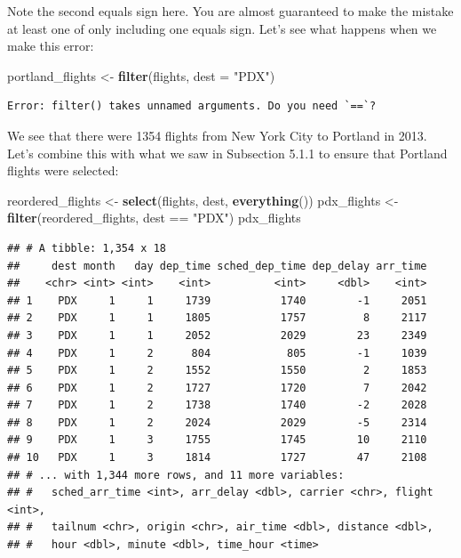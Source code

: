 \documentclass[]{tufte-book}
\newenvironment{Shaded}{\begin{snugshade}}{\end{snugshade}}
\newcommand{\KeywordTok}[1]{\textcolor[rgb]{0.13,0.29,0.53}{\textbf{{#1}}}}
\newcommand{\DataTypeTok}[1]{\textcolor[rgb]{0.13,0.29,0.53}{{#1}}}
\newcommand{\StringTok}[1]{\textcolor[rgb]{0.31,0.60,0.02}{{#1}}}
\newcommand{\NormalTok}[1]{{#1}}
\begin{document}
Note the second equals sign here. You are almost guaranteed to make the
mistake at least one of only including one equals sign. Let's see what
happens when we make this error:

\begin{Shaded}
\begin{Highlighting}[]
\NormalTok{portland_flights <-}\StringTok{ }\KeywordTok{filter}\NormalTok{(flights, }\DataTypeTok{dest =} \StringTok{"PDX"}\NormalTok{)}
\end{Highlighting}
\end{Shaded}

\begin{verbatim}
Error: filter() takes unnamed arguments. Do you need `==`?
\end{verbatim}

We see that there were 1354 flights from New York City to Portland in
2013. Let's combine this with what we saw in Subsection 5.1.1 to ensure
that Portland flights were selected:

\begin{Shaded}
\begin{Highlighting}[]
\NormalTok{reordered_flights <-}\StringTok{ }\KeywordTok{select}\NormalTok{(flights, dest, }\KeywordTok{everything}\NormalTok{())}
\NormalTok{pdx_flights <-}\StringTok{ }\KeywordTok{filter}\NormalTok{(reordered_flights, dest ==}\StringTok{ "PDX"}\NormalTok{)}
\NormalTok{pdx_flights}
\end{Highlighting}
\end{Shaded}

\begin{verbatim}
## # A tibble: 1,354 x 18
##     dest month   day dep_time sched_dep_time dep_delay arr_time
##    <chr> <int> <int>    <int>          <int>     <dbl>    <int>
## 1    PDX     1     1     1739           1740        -1     2051
## 2    PDX     1     1     1805           1757         8     2117
## 3    PDX     1     1     2052           2029        23     2349
## 4    PDX     1     2      804            805        -1     1039
## 5    PDX     1     2     1552           1550         2     1853
## 6    PDX     1     2     1727           1720         7     2042
## 7    PDX     1     2     1738           1740        -2     2028
## 8    PDX     1     2     2024           2029        -5     2314
## 9    PDX     1     3     1755           1745        10     2110
## 10   PDX     1     3     1814           1727        47     2108
## # ... with 1,344 more rows, and 11 more variables:
## #   sched_arr_time <int>, arr_delay <dbl>, carrier <chr>, flight <int>,
## #   tailnum <chr>, origin <chr>, air_time <dbl>, distance <dbl>,
## #   hour <dbl>, minute <dbl>, time_hour <time>
\end{verbatim}
\end{document}

